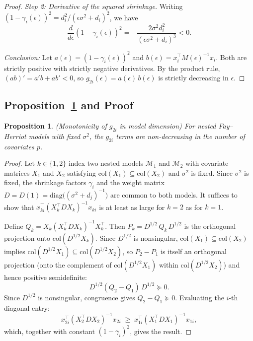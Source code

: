 \documentclass[11pt]{article}
\theoremstyle{plain}
\newtheorem{proposition}[theorem]{Proposition}
\theoremstyle{definition}
\theoremstyle{remark}
\begin{document}
\begin{proof}
\textit{Step 2: Derivative of the squared shrinkage.}
Writing $(1-\gamma_i(\epsilon))^2 = d_i^2/(\epsilon\sigma^2 + d_i)^2$,
we have
\[
\frac{d}{d\epsilon}(1-\gamma_i(\epsilon))^2
= -\frac{2\sigma^2 d_i^2}{(\epsilon\sigma^2 + d_i)^3} < 0.
\]

\textit{Conclusion:} Let $a(\epsilon) = (1-\gamma_i(\epsilon))^2$ and
$b(\epsilon) = x_i^\top M(\epsilon)^{-1}x_i$. Both are strictly
positive with strictly negative derivatives. By the product rule,
$(ab)' = a'b + ab' < 0$, so $g_{2i}(\epsilon) = a(\epsilon)\,
b(\epsilon)$ is strictly decreasing in $\epsilon$.
\end{proof}

\subsection{Proposition~\ref{prop:g2i_covariates} and Proof}
\label{app:g2i_covariates}

\begin{proposition}
\label{prop:g2i_covariates}
(Monotonicity of $g_{2i}$ in model dimension) For nested Fay--Herriot models with fixed $\sigma^2$, the $g_{2i}$ terms are non-decreasing in the number of covariates $p$.
\end{proposition}

\begin{proof}
Let $k \in \{1,2\}$ index two nested models $\mathcal{M}_1$ and
$\mathcal{M}_2$ with covariate matrices $X_1$ and $X_2$ satisfying
$\mathrm{col}(X_1) \subseteq \mathrm{col}(X_2)$ and $\sigma^2$ is fixed. Since $\sigma^2$ is
fixed, the shrinkage factors $\gamma_i$ and the weight matrix
$D = D(1) = \mathrm{diag}\big((\sigma^2 + d_j)^{-1}\big)$ are common to
both models. It suffices to show that
$x_{ki}^\top (X_k^\top D X_k)^{-1} x_{ki}$ is at least as large for
$k=2$ as for $k=1$.

Define $Q_k = X_k(X_k^\top D X_k)^{-1}X_k^\top$. Then
$P_k = D^{1/2}\, Q_k\, D^{1/2}$ is the orthogonal projection onto
$\mathrm{col}(D^{1/2} X_k)$. Since $D^{1/2}$ is nonsingular,
$\mathrm{col}(X_1) \subseteq \mathrm{col}(X_2)$ implies
$\mathrm{col}(D^{1/2}X_1) \subseteq \mathrm{col}(D^{1/2}X_2)$, so
$P_2 - P_1$ is itself an orthogonal projection (onto the complement
of $\mathrm{col}(D^{1/2}X_1)$ within $\mathrm{col}(D^{1/2}X_2)$) and
hence positive semidefinite:
\[
D^{1/2}(Q_2 - Q_1)\,D^{1/2} \succeq 0.
\]
Since $D^{1/2}$ is nonsingular, congruence gives
$Q_2 - Q_1 \succeq 0$. Evaluating the $i$-th diagonal entry:
\[
x_{2i}^\top (X_2^\top D X_2)^{-1} x_{2i} \;\geq\;
x_{1i}^\top (X_1^\top D X_1)^{-1} x_{1i},
\]
which, together with constant $(1-\gamma_i)^2$, gives the result.
\end{proof}
\end{document}
